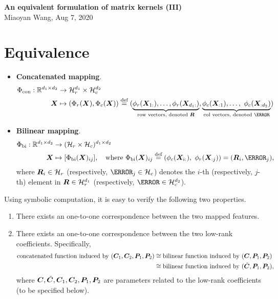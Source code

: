 \documentclass[11pt]{article}
\theoremstyle{plain}
\theoremstyle{definition}
\newcommand*{\KeepStyleUnderBrace}[1]{%
  \mathop{%
    \mathchoice
    {\underbrace{\displaystyle#1}}%
    {\underbrace{\textstyle#1}}%
    {\underbrace{\scriptstyle#1}}%
    {\underbrace{\scriptscriptstyle#1}}%
  }\limits
}
\begin{document}
\begin{center}
{\bf \Large An equivalent formulation of matrix kernels (III)}\\
Miaoyan Wang, Aug 7, 2020\\
\end{center}

\section{Equivalence}
\begin{itemize}
\item {\bf Concatenated mapping}.
\begin{align}
\Phi_\text{con}: \mathbb{R}^{d_1\times d_2}& \to \tH_r^{d_1}\times \tH_c^{d_2} \\
\mX& \mapsto (\Phi_r(\mX),\Phi_c(\mX))\stackrel{\text{def}}{= }(\KeepStyleUnderBrace{\phi_r(\mX_{1:}),\ldots,\phi_r(\mX_{d_1:})}_{\text{row vectors, denoted $\mR$}}, \KeepStyleUnderBrace{\phi_c(\mX_{:1}),\ldots,\ \phi_c(\mX_{:d_2})}_{\text{col vectors, denoted $\mL$}})
\end{align}
\item {\bf Bilinear mapping}.
\begin{align}
\Phi_{\text{bi}}: \mathbb{R}^{d_1\times d_2}& \to (\tH_r\times \tH_c)^{d_1\times d_2}\\
\mX& \mapsto [\Phi_{\text{bi}}(\mX)_{ij}],\quad \text{where}\ \Phi_{\text{bi}}(\mX)_{ij}\stackrel{\text{def}}{=}(\phi_c(\mX_{i:}),\ \phi_r(\mX_{:j})) = (\mR_i, \mL_j),
\end{align}
where $\bm{R}_i\in\mathcal{H}_r$ (respectively, $\mL_j\in \tH_c$) denotes the $i$-th (respectively, $j$-th) element in $\bm{R}\in\mathcal{H}_r^{d_1}$ (respectively, $\mL\in \tH_c^{d_2}$).

\end{itemize}
Using symbolic computation, it is easy to verify the following two properties. 
\begin{enumerate}
\item There exists an one-to-one correspondence between the two mapped features. 
\item There exists an one-to-one correspondence between the two low-rank coefficients. Specifically, 
\begin{align}\label{eq:equivalence}
\text{concatenated function induced by }( \bm C_1, \bm C_2, \bm{P}_1, \bm{P}_2)&\cong \text{bilinear function induced by }( \bm C,\bm{P}_1,\bm{P}_2)\notag \\
&\cong \text{bilinear function induced by } (\tilde {\bm C}, \bm{P}_1, \bm{P}_2),
\end{align}
where $ \bm C, \tilde {\bm C}, \bm C_1, \bm C_2, \bm{P}_1, \bm{P}_2$ are parameters related to the low-rank coefficients (to be specified below).
\end{enumerate}
\end{document}
